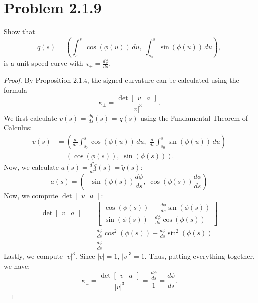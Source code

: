 \documentclass[12pt]{article}
\newcommand\abs[1]{\left| #1 \right|}
\newcommand\parens[1]{\left( #1 \right)}
\newcommand\solproof[1]{\begin{mdframed}
\begin{proof} #1
\end{proof}
\end{mdframed}}
\begin{document}
\section*{Problem 2.1.9}
Show that
\[q(s) = \parens{\int_{s_0}^s \cos(\phi(u))\,{du},\; \int_{s_0}^s \sin(\phi(u))\,{du}},\] 
is a unit speed curve with $\kappa_\pm = \frac{d\phi}{ds}$.

\solproof{
    By Proposition 2.1.4, the signed curvature can be calculated using the formula
    \begin{equation*}
        \kappa_\pm = \frac{\det \begin{bmatrix} v & a \end{bmatrix}}{\abs{v}^3}.
    \end{equation*}
    We first calculate $v(s)$ = $\frac{dq}{ds}(s)$ = $\dot{q}(s)$ using the Fundamental Theorem of Calculus:
    \begin{align*}
        v(s) &= \parens{\frac{d}{ds} \int_{s_0}^s \cos\parens{\phi\parens{u}}\,{du},\; \frac{d}{ds} \int_{s_0}^s \sin\parens{\phi\parens{u}}\,{du}} \\
        &= \parens{\cos\parens{\phi\parens{s}},\; \sin\parens{\phi\parens{s}}}.
    \end{align*}
    Now, we calculate $a(s) = \frac{d^2q}{dt^2}(s) = \ddot{q}(s)$:
    \[a(s) = \parens{-\sin\parens{\phi\parens{s}} \frac{d\phi}{ds},\; \cos\parens{\phi\parens{s}} \frac{d\phi}{ds}}\]
    Now, we compute $\det \begin{bmatrix} v & a \end{bmatrix}$:
    \begin{align*}
        \det \begin{bmatrix} v & a \end{bmatrix} &=
        \begin{bmatrix}
            \cos\parens{\phi\parens{s}} & -\frac{d\phi}{ds} \sin\parens{\phi\parens{s}} \\
            \sin\parens{\phi\parens{s}} & \frac{d\phi}{ds} \cos\parens{\phi\parens{s}} 
        \end{bmatrix} \\
        &= \frac{d\phi}{ds} \cos^2\parens{\phi\parens{s}} + \frac{d\phi}{ds} \sin^2\parens{\phi\parens{s}} \\
        &= \frac{d\phi}{ds}
    \end{align*}
    Lastly, we compute $\abs{v}^3$. Since $\abs{v} = 1$, $\abs{v}^3 = 1$.
    Thus, putting everything together, we have:
    \[\kappa_\pm = \frac{\det \begin{bmatrix} v & a \end{bmatrix}}{\abs{v}^3} = \frac{\frac{d\phi}{ds}}{1} = \frac{d\phi}{ds}.\]
}
\end{document}
